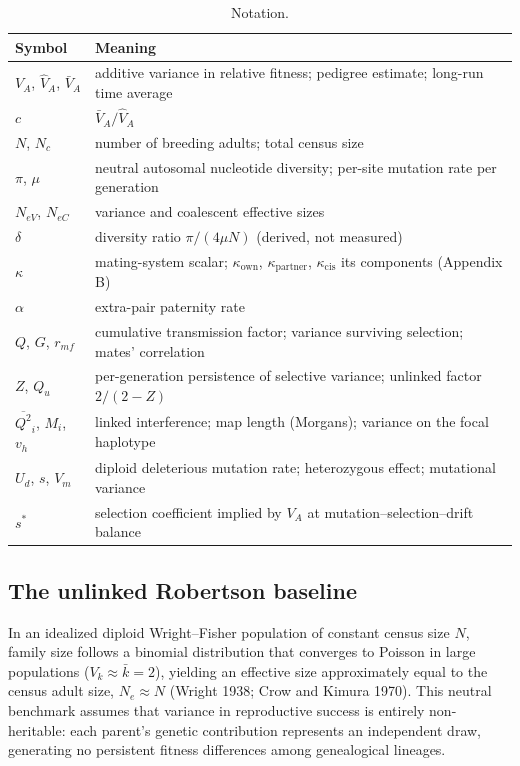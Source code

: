 \documentclass[12pt]{article}
\begin{document}
\begin{table}[h!]
\centering
\caption{Notation.}
\label{tab:notation}
\small
\begin{tabular}{ll}
\toprule
Symbol & Meaning \\
\midrule
$V_A$, $\hat{V}_A$, $\bar{V}_A$ & additive variance in relative fitness; pedigree estimate; long-run time average \\
$c$ & $\bar{V}_A/\hat{V}_A$ \\
$N$, $N_c$ & number of breeding adults; total census size \\
$\pi$, $\mu$ & neutral autosomal nucleotide diversity; per-site mutation rate per generation \\
$N_{eV}$, $N_{eC}$ & variance and coalescent effective sizes \\
$\delta$ & diversity ratio $\pi/(4\mu N)$ (derived, not measured) \\
$\kappa$ & mating-system scalar; $\kappa_\text{own}$, $\kappa_\text{partner}$, $\kappa_\text{cis}$ its components (Appendix B) \\
$\alpha$ & extra-pair paternity rate \\
$Q$, $G$, $r_{mf}$ & cumulative transmission factor; variance surviving selection; mates' correlation \\
$Z$, $Q_u$ & per-generation persistence of selective variance; unlinked factor $2/(2-Z)$ \\
$\overline{Q^2}_i$, $M_i$, $v_h$ & linked interference; map length (Morgans); variance on the focal haplotype \\
$U_d$, $s$, $V_m$ & diploid deleterious mutation rate; heterozygous effect; mutational variance \\
$s^*$ & selection coefficient implied by $V_A$ at mutation--selection--drift balance \\
\bottomrule
\end{tabular}
\end{table}

\subsection{The unlinked Robertson baseline}
In an idealized diploid Wright--Fisher population of constant census size $N$, family size follows a binomial distribution that converges to Poisson in large populations ($V_k \approx \bar{k} = 2$), yielding an effective size approximately equal to the census adult size, $N_e \approx N$ (Wright 1938; Crow and Kimura 1970). This neutral benchmark assumes that variance in reproductive success is entirely non-heritable: each parent's genetic contribution represents an independent draw, generating no persistent fitness differences among genealogical lineages.
\end{document}
